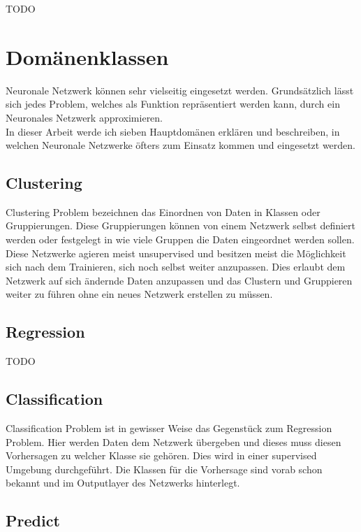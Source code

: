 TODO

\section{Domänenklassen}
\label{sec:Domänenklassen}

Neuronale Netzwerk können sehr vielseitig eingesetzt werden. 
Grundsätzlich lässt sich jedes Problem, welches als Funktion repräsentiert werden kann, durch ein Neuronales Netzwerk approximieren. \\

In dieser Arbeit werde ich sieben Hauptdomänen erklären und beschreiben, in welchen Neuronale Netzwerke öfters zum Einsatz kommen und eingesetzt werden.

\subsection{Clustering}
\label{subsec:Clustering}

Clustering Problem bezeichnen das Einordnen von Daten in Klassen oder Gruppierungen. 
Diese Gruppierungen können von einem Netzwerk selbst definiert werden oder festgelegt in wie viele Gruppen die Daten eingeordnet werden sollen. 
Diese Netzwerke agieren meist unsupervised und besitzen meist die Möglichkeit sich nach dem Trainieren, sich noch selbst weiter anzupassen. 
Dies erlaubt dem Netzwerk auf sich ändernde Daten anzupassen und das Clustern und Gruppieren weiter zu führen ohne ein neues Netzwerk erstellen zu müssen.

\subsection{Regression}
\label{subsec:Regression}

TODO

\subsection{Classification}
\label{subsec:Classification}

Classification Problem ist in gewisser Weise das Gegenstück zum Regression Problem. 
Hier werden Daten dem Netzwerk übergeben und dieses muss diesen Vorhersagen zu welcher Klasse sie gehören. Dies wird in einer supervised Umgebung durchgeführt. 
Die Klassen für die Vorhersage sind vorab schon bekannt und im Outputlayer des Netzwerks hinterlegt.

\subsection{Predict}
\label{subsec:Predict}

